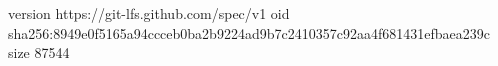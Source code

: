 version https://git-lfs.github.com/spec/v1
oid sha256:8949e0f5165a94ccceb0ba2b9224ad9b7c2410357c92aa4f681431efbaea239c
size 87544
